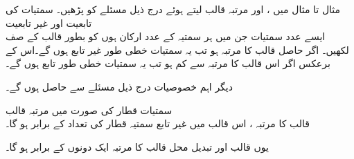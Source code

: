 مثال  تا مثال  میں ،  اور مرتبہ قالب  لیتے ہوئے  درج ذیل مسئلے  کو پڑھیں۔ 
\quad سمتیات کی  تابعیت اور غیر تابعیت\\
ایسے  عدد سمتیات جن میں ہر سمتیہ کے  عدد ارکان ہوں کو بطور قالب کے صف لکھیں۔ اگر حاصل قالب کا مرتبہ  ہو تب یہ سمتیات خطی طور غیر تابع ہوں گے۔اس کے برعکس اگر اس قالب کا مرتبہ  سے کم ہو تب یہ سمتیات خطی طور تابع ہوں گے۔

دیگر اہم خصوصیات درج ذیل مسئلے سے حاصل ہوں گے۔

\quad سمتیات قطار کی صورت میں مرتبہ قالب\\
قالب  کا مرتبہ ، اس قالب میں غیر تابع سمتیہ قطار کی تعداد کے برابر ہو گا۔

یوں قالب  اور تبدیل محل قالب  کا مرتبہ ایک دونوں کے  برابر ہو گا۔ 

